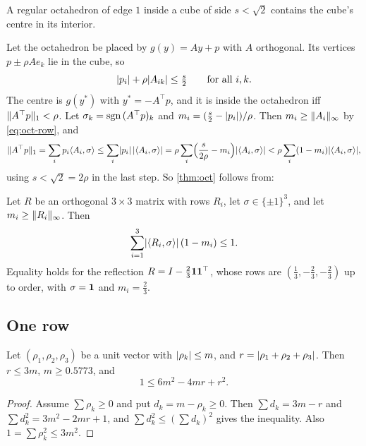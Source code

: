 \documentclass[11pt,a4paper]{article}
\begin{document}
\begin{theorem}\label{thm:oct}
A regular octahedron of edge $1$ inside a cube of side $s<\sqrt2$ contains the cube's centre in its interior.
\end{theorem}

Let the octahedron be placed by $g(y)=Ay+p$ with $A$ orthogonal. Its vertices $p\pm\rho Ae_k$ lie in the cube, so
\begin{equation}\label{eq:oct-row}
\lvert p_i\rvert+\rho\lvert A_{ik}\rvert\le\tfrac s2\qquad\text{for all } i,k.
\end{equation}
The centre is $g(y^*)$ with $y^*=-A^\top p$, and it is inside the octahedron iff $\lVert A^\top p\rVert_1<\rho$. Let $\sigma_k=\operatorname{sgn}\,(A^\top p)_k$ and $m_i=(\tfrac s2-\lvert p_i\rvert)/\rho$. Then $m_i\ge\lVert A_i\rVert_\infty$ by \eqref{eq:oct-row}, and
\[
\lVert A^\top p\rVert_1=\sum_i p_i\langle A_i,\sigma\rangle\le\sum_i\lvert p_i\rvert\,\lvert \langle A_i,\sigma\rangle\rvert=\rho\sum_i\Bigl(\frac{s}{2\rho}-m_i\Bigr)\lvert \langle A_i,\sigma\rangle\rvert<\rho\sum_i(1-m_i)\lvert \langle A_i,\sigma\rangle\rvert,
\]
using $s<\sqrt2=2\rho$ in the last step. So \cref{thm:oct} follows from:

\begin{theorem}\label{thm:lemmaO}
Let $R$ be an orthogonal $3\times3$ matrix with rows $R_i$, let $\sigma\in\{\pm1\}^3$, and let $m_i\ge\lVert R_i\rVert_\infty$. Then
\[
\sum_{i=1}^3\lvert \langle R_i,\sigma\rangle\rvert\,(1-m_i)\le1.
\]
Equality holds for the reflection $R=I-\tfrac23\mathbf 1\mathbf 1^\top$, whose rows are $(\tfrac13,-\tfrac23,-\tfrac23)$ up to order, with $\sigma=\mathbf 1$ and $m_i=\tfrac23$.
\end{theorem}

\subsection{One row}
\begin{lemma}\label{lem:row}
Let $(\rho_1,\rho_2,\rho_3)$ be a unit vector with $\lvert \rho_k\rvert\le m$, and $r=\lvert \rho_1+\rho_2+\rho_3\rvert$. Then $r\le3m$, $m\ge 0.5773$, and
\[
1\le 6m^2-4mr+r^2.
\]
\end{lemma}
\begin{proof}
Assume $\sum\rho_k\ge0$ and put $d_k=m-\rho_k\ge0$. Then $\sum d_k=3m-r$ and $\sum d_k^2=3m^2-2mr+1$, and $\sum d_k^2\le(\sum d_k)^2$ gives the inequality. Also $1=\sum\rho_k^2\le3m^2$.
\end{proof}
\end{document}
